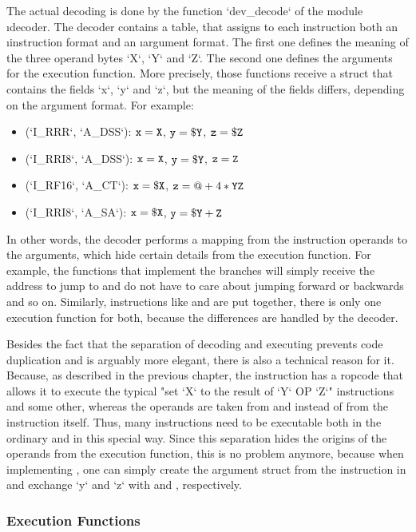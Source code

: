 The actual decoding is done by the function `dev_decode` of the module \i{decoder}. The decoder contains a table, that assigns to each instruction both an \i{instruction format} and an \i{argument format}. The first one defines the meaning of the three operand bytes `X`, `Y` and `Z`. The second one defines the arguments for the execution function. More precisely, those functions receive a struct that contains the fields `x`, `y` and `z`, but the meaning of the fields differs, depending on the argument format. For example:
\begin{itemize}
	\item {} (`I_RRR`, `A_DSS`): ${\tt x}={\tt X}$, ${\tt y}={\tt \$Y}$, ${\tt z}={\tt \$Z}$
	\item {} (`I_RRI8`, `A_DSS`): ${\tt x}={\tt X}$, ${\tt y}={\tt \$Y}$, ${\tt z}={\tt Z}$
	\item {} (`I_RF16`, `A_CT`): ${\tt x}={\tt \$X}$, ${\tt z}=@ + 4*{\tt YZ}$
	\item {} (`I_RRI8`, `A_SA`): ${\tt x}={\tt \$X}$, ${\tt y}={\tt \$Y} + {\tt Z}$
\end{itemize}
In other words, the decoder performs a mapping from the instruction operands to the arguments, which hide certain details from the execution function. For example, the functions that implement the branches will simply receive the address to jump to and do not have to care about jumping forward or backwards and so on. Similarly, instructions like  and  are put together, \ie there is only one execution function for both, because the differences are handled by the decoder.

Besides the fact that the separation of decoding and executing prevents code duplication and is arguably more elegant, there is also a technical reason for it. Because, as described in the previous chapter, the instruction  has a ropcode that allows it to execute the typical "set `X` to the result of `Y` OP `Z`" instructions and some other, whereas the operands are taken from  and  instead of from the instruction itself. Thus, many instructions need to be executable both in the ordinary and in this special way. Since this separation hides the origins of the operands from the execution function, this is no problem anymore, because when implementing , one can simply create the argument struct from the instruction in  and exchange `y` and `z` with  and , respectively.

\subsubsection{Execution Functions}

